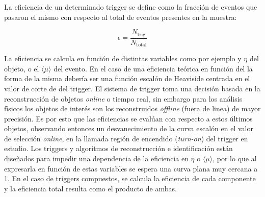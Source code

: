 La eficiencia de un determinado trigger se define como la fracción de eventos que pasaron el mismo con respecto al total de eventos presentes en la muestra:

\begin{equation}
	\epsilon = \frac{N_\text{trig}}{N_\text{total}}
\end{equation}

La eficiencia se calcula en función de distintas variables como por ejemplo \pt y $\eta$ del objeto, o el $\langle\mu\rangle$ del evento. En el caso de una eficiencia teórica en función del \pt la forma de la misma debería ser una función escalón de Heaviside centrada en el valor de corte de \pt del trigger. El sistema de trigger toma una decisión basada en la reconstrucción de objetos \textit{online} o tiempo real, sin embargo para los análisis físicos los objetos de interés son los reconstruidos \textit{offline} (fuera de linea) de mayor precisión. Es por esto que las eficiencias se evalúan con respecto a estos últimos objetos, observando entonces un desvanecimiento de la curva escalón en el valor de selección \textit{online}, en la llamada región de encendido (\textit{turn-on}) del trigger en estudio. 
Los triggers y algoritmos de reconstrucción e identificación están diseñados para impedir una dependencia de la eficiencia en $\eta$ o $\langle\mu\rangle$, por lo que al expresarla en función de estas variables se espera una curva plana muy cercana a 1. En el caso de triggers compuestos, se calcula la eficiencia de cada componente y la eficiencia total resulta como el producto de ambas.

